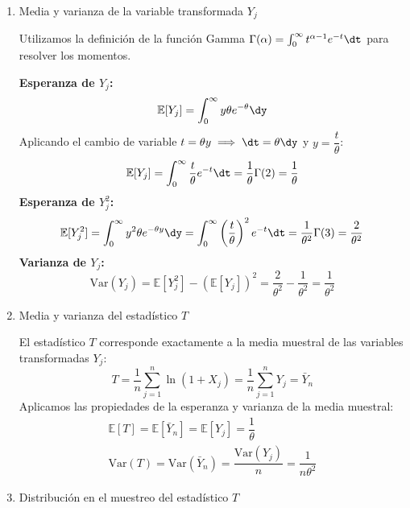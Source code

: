 \begin{enumerate}[label=\color{red}\textbf{\arabic*)}]
\begin{enumerate}[label=\arabic*)]
		            Definimos una nueva variable aleatoria aplicando la transformación sobre  $X_j$:  $$Y_j=\ln(1+X_j)$$ Aplicamos el \textbf{Teorema de transformación de una variable aleatoria:} \[
			            \begin{array}{c}
				            y=\varphi(x)=\ln(1+x)   \\
				            \varphi^{-1}(y)=e^{y}-1 \\
				            \dfrac{\mathrm{d}}{\mathrm{d}y}(\varphi^{-1}(y))=e^{y}
			            \end{array}
		            \]
		            Calculamos la función de densidad de la nueva variable $Y_j$:  \[
			            \begin{array}{c}
				            f_Y(y)=f_X(\varphi^{-1}(y))\left| \dfrac{\mathrm{d}}{\mathrm{d}y}(\varphi^{-1}(y)) \right| \\
				            f_Y(y)=\dfrac{\theta}{(1+(e^{y}-1))^{1+\theta}}\cdot e^{y}=\dfrac{\theta}{e^{y(1+\theta)} }\cdot e^{y} =\theta e^{-y\theta},\quad y>0
			            \end{array}
		            \]
		      \item Media y varianza de la variable transformada $Y_j$

		            Utilizamos la definición de la función Gamma  $\Gamma(\alpha)=\int_{0}^{\infty}  t^{\alpha-1}e^{-t}\dt $ para resolver los momentos.

		            \textbf{Esperanza de $Y_j$:} $$\mathbb{E}[Y_j]=\int_{0}^{\infty} y\theta e^{-\theta}\dy$$
		            Aplicando el cambio de variable $t=\theta y\implies\dt=\theta\dy$ y $y=\dfrac{t}{\theta}$: \[
			            \mathbb{E}[Y_j]=\int_{0}^{\infty} \dfrac{t}{\theta}e^{-t}\dt=\dfrac{1}{\theta}\Gamma(2)=\dfrac{1}{\theta}
		            \]
		            \textbf{Esperanza de $Y_j^2$:} \[
			            \mathbb{E}[Y_j^2]=\int_{0}^{\infty} y^2\theta e^{-\theta y}\dy =\int_{0}^{\infty} \left( \dfrac{t}{\theta} \right) ^2 e^{-t}\dt=\dfrac{1}{\theta^2}\Gamma(3)=\dfrac{2}{\theta^2}
		            \]
		            \textbf{Varianza de $Y_j$:} \[
			            \mathrm{Var}(Y_j)=\mathbb{E}[Y_j^2]-(\mathbb{E}[Y_j])^2=\dfrac{2}{\theta^2}-\dfrac{1}{\theta^2}=\dfrac{1}{\theta^2}
		            \]
		      \item Media y varianza del estadístico $T$

		            El estadístico  $T$ corresponde exactamente a la media muestral de las variables transformadas  $Y_j$:  \[
			            T=\dfrac{1}{n}\sum_{j=1}^{n} \ln(1+X_j)=\dfrac{1}{n}\sum_{j=1}^{n} Y_j=\bar{Y}_n
		            \]
		            Aplicamos las propiedades de la esperanza y varianza de la media muestral: \[
			            \begin{array}{c}
				            \mathbb{E}[T]=\mathbb{E}[\bar{Y}_n]=\mathbb{E}[Y_j]=\dfrac{1}{\theta} \\
				            \mathrm{Var}(T)=\mathrm{Var}(\bar{Y}_n)=\dfrac{\mathrm{Var}(Y_j)}{n}=\dfrac{1}{n\theta^2}
			            \end{array}
		            \]
		      \item Distribución en el muestreo del estadístico $T$


\end{enumerate}
\end{enumerate}
